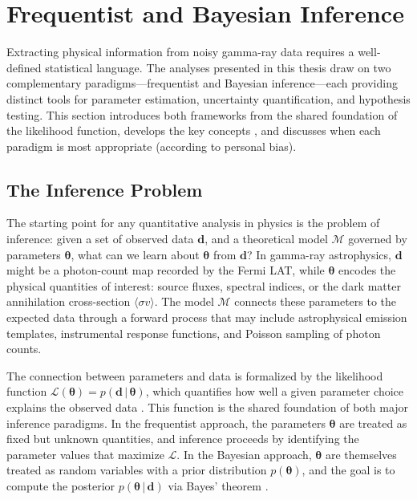 \section{Frequentist and Bayesian Inference}
\label{sec:3.1}

Extracting physical information from noisy gamma-ray data requires a well-defined statistical language.
The analyses presented in this thesis draw on two complementary paradigms---frequentist and Bayesian inference---each providing distinct tools for parameter estimation, uncertainty quantification, and hypothesis testing.
This section introduces both frameworks from the shared foundation of the likelihood function, develops the key concepts , and discusses when each paradigm is most appropriate (according to personal bias).


\subsection{The Inference Problem}
\label{sec:3.1.1}

The starting point for any quantitative analysis in physics is the problem of inference: given a set of observed data $\mathbf{d}$, and a theoretical model $\mathcal{M}$ governed by parameters $\boldsymbol{\theta}$, what can we learn about $\boldsymbol{\theta}$ from $\mathbf{d}$?
In gamma-ray astrophysics, $\mathbf{d}$ might be a photon-count map recorded by the Fermi LAT, while $\boldsymbol{\theta}$ encodes the physical quantities of interest: source fluxes, spectral indices, or the dark matter annihilation cross-section $\langle \sigma v \rangle$.
The model $\mathcal{M}$ connects these parameters to the expected data through a forward process that may include astrophysical emission templates, instrumental response functions, and Poisson sampling of photon counts.

The connection between parameters and data is formalized by the likelihood function $\mathcal{L}(\boldsymbol{\theta}) = p(\mathbf{d} \,|\, \boldsymbol{\theta})$, which quantifies how well a given parameter choice explains the observed data \cite{Cranmer:2020}.
This function is the shared foundation of both major inference paradigms.
In the frequentist approach, the parameters $\boldsymbol{\theta}$ are treated as fixed but unknown quantities, and inference proceeds by identifying the parameter values that maximize $\mathcal{L}$.
In the Bayesian approach, $\boldsymbol{\theta}$ are themselves treated as random variables with a prior distribution $p(\boldsymbol{\theta})$, and the goal is to compute the posterior $p(\boldsymbol{\theta} \,|\, \mathbf{d})$ via Bayes' theorem \cite{bishop,Hastie:2009}.

